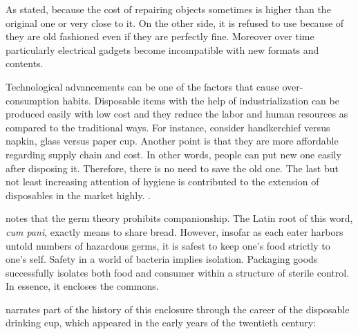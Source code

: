 As stated,  \citep[viii]{hawkins2005ethics} because the cost of repairing objects sometimes is higher than the original one or very close to it. On the other side, it is refused to use because of they are old fashioned even if they are perfectly fine. Moreover over time particularly electrical gadgets become incompatible with new formats and contents.

Technological advancements can be one of the factors that cause over-consumption habits. Disposable items with the help of industrialization can be produced easily with low cost and they reduce the labor and human resources as compared to the traditional ways. For instance, consider handkerchief versus napkin, glass versus paper cup. Another point is that they are more affordable regarding supply chain and cost. In other words, people can put new one easily after disposing it. Therefore, there is no need to save the old one. The last but not least increasing attention of hygiene is contributed to the extension of disposables in the market highly.  \citep[70]{kennedy2007ontology}.


\cite{kennedy2007ontology} notes that the germ theory prohibits companionship. The Latin root of this word, \textit{cum pani}, exactly means to share bread. However, insofar as each eater harbors untold numbers of hazardous germs, it is safest to keep one’s food strictly to one’s self. Safety in a world of bacteria implies isolation. Packaging goods successfully isolates both food and consumer within a structure of sterile control. In essence, it encloses the commons.

\citep[176--177]{strasser1999waste} narrates part of the history of this enclosure through the career of the disposable drinking cup, which appeared in the early years of the twentieth century:

